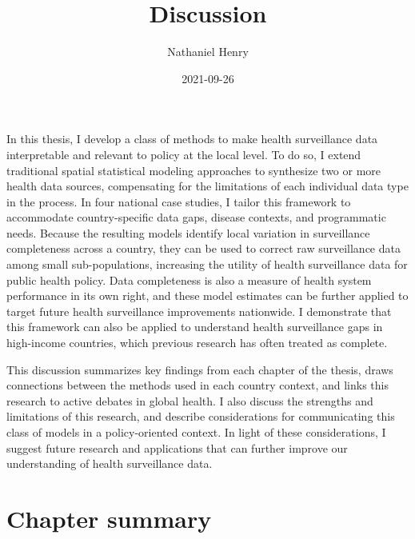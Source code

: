 \documentclass[
]{article}
\title{Discussion}
\author{Nathaniel Henry\textsuperscript{}}
\date{2021-09-26}
\begin{document}
\maketitle

In this thesis, I develop a class of methods to make health surveillance data interpretable and relevant to policy at the local level. To do so, I extend traditional spatial statistical modeling approaches to synthesize two or more health data sources, compensating for the limitations of each individual data type in the process. In four national case studies, I tailor this framework to accommodate country-specific data gaps, disease contexts, and programmatic needs. Because the resulting models identify local variation in surveillance completeness across a country, they can be used to correct raw surveillance data among small sub-populations, increasing the utility of health surveillance data for public health policy. Data completeness is also a measure of health system performance in its own right, and these model estimates can be further applied to target future health surveillance improvements nationwide. I demonstrate that this framework can also be applied to understand health surveillance gaps in high-income countries, which previous research has often treated as complete.

This discussion summarizes key findings from each chapter of the thesis, draws connections between the methods used in each country context, and links this research to active debates in global health. I also discuss the strengths and limitations of this research, and describe considerations for communicating this class of models in a policy-oriented context. In light of these considerations, I suggest future research and applications that can further improve our understanding of health surveillance data.

\hypertarget{chapter-summary}{%
\section{Chapter summary}\label{chapter-summary}}
\end{document}
